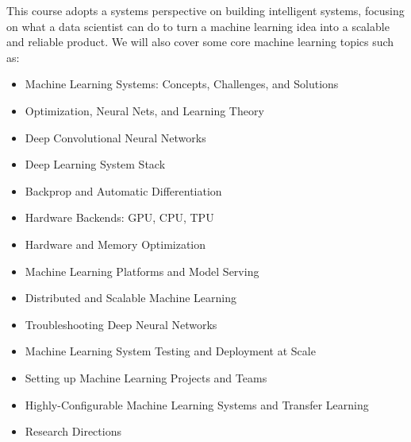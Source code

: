 \documentclass[11pt]{article}
\begin{document}
This course adopts a systems perspective on building intelligent systems, focusing on what a data scientist can do to turn a machine learning idea into a scalable and reliable product. We will also cover some core machine learning topics such as:
\begin{itemize}
\item Machine Learning Systems: Concepts, Challenges, and Solutions
\item Optimization, Neural Nets, and Learning Theory
\item Deep Convolutional Neural Networks
\item Deep Learning System Stack
\item Backprop and Automatic Differentiation
\item Hardware Backends: GPU, CPU, TPU
\item Hardware and Memory Optimization
\item Machine Learning Platforms and Model Serving
\item Distributed and Scalable Machine Learning
\item Troubleshooting Deep Neural Networks
\item Machine Learning System Testing and Deployment at Scale 
\item Setting up Machine Learning Projects and Teams 
\item Highly-Configurable Machine Learning Systems and Transfer Learning
\item Research Directions
\end{itemize}


\newpage
\end{document}
